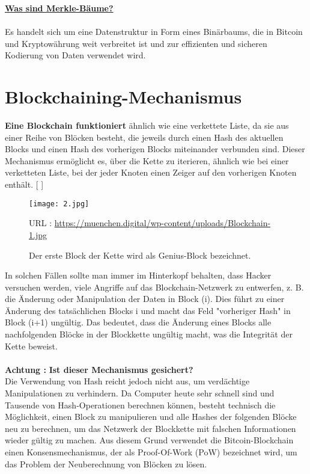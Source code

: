 \documentclass[ngerman]{scrreprt}
\begin{document}
\large
\newpage
\underline{\textbf{Was sind Merkle-Bäume?}} \\ \\
\normalsize
Es handelt sich um eine Datenstruktur in Form eines Binärbaums, die in Bitcoin und Kryptowährung weit verbreitet ist und zur effizienten und sicheren Kodierung von Daten verwendet wird.




\section{Blockchaining-Mechanismus}
\textbf{Eine Blockchain funktioniert} ähnlich wie eine verkettete Liste, da sie aus einer Reihe von Blöcken besteht, die jeweils durch einen Hash des aktuellen Blocks und einen Hash des vorherigen Blocks miteinander verbunden sind. Dieser Mechanismus ermöglicht es, über die Kette zu iterieren, ähnlich wie bei einer verketteten Liste, bei der jeder Knoten einen Zeiger auf den vorherigen Knoten enthält. [ \cite{fool} ]

\begin{figure}[h!]
	\centering
	\texttt{[image: 2.jpg]}
	\caption{Der erste Block der Kette wird als Genius-Block bezeichnet.}
	\small URL : \url{https://muenchen.digital/wp-content/uploads/Blockchain-1.jpg}
\end{figure} 
In solchen Fällen sollte man immer im Hinterkopf behalten, dass Hacker versuchen werden, viele Angriffe auf das Blockchain-Netzwerk zu entwerfen, z. B. die Änderung oder Manipulation der Daten in Block (i). Dies führt zu einer Änderung des tatsächlichen Blocks i und macht das Feld "vorheriger Hash" in Block (i+1) ungültig. Das bedeutet, dass die Änderung eines Blocks alle nachfolgenden Blöcke in der Blockkette ungültig macht, was die Integrität der Kette beweist.\\ \\
\color{red}
\Large{\textbf{Achtung :}}
\color{black}
\textbf{Ist dieser Mechanismus gesichert?}\\
\normalsize
Die Verwendung von Hash reicht jedoch nicht aus, um verdächtige Manipulationen zu verhindern. Da Computer heute sehr schnell sind und Tausende von Hash-Operationen berechnen können, besteht technisch die Möglichkeit, einen Block zu manipulieren und alle Hashes der folgenden Blöcke neu zu berechnen, um das Netzwerk der Blockkette mit falschen Informationen wieder gültig zu machen. Aus diesem Grund verwendet die Bitcoin-Blockchain einen Konsensmechanismus, der als Proof-Of-Work (PoW) bezeichnet wird, um das Problem der Neuberechnung von Blöcken zu lösen.
\end{document}
